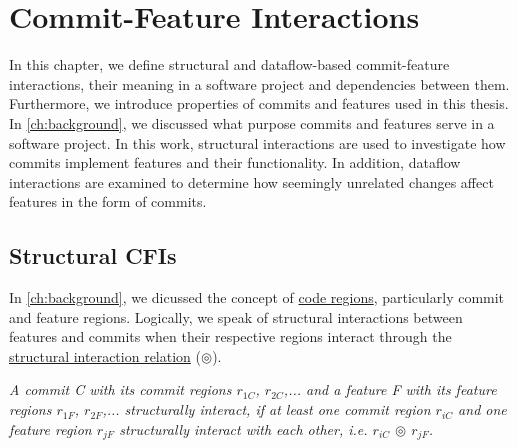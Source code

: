 \chapter{Commit-Feature Interactions}\label{ch:example_chapter}

In this chapter, we define structural and dataflow-based commit-feature interactions, their meaning in a software project and dependencies between them.
Furthermore, we introduce properties of commits and features used in this thesis. 
In \autoref{ch:background}, we discussed what purpose commits and features serve in a software project.
In this work, structural interactions are used to investigate how commits implement features and their functionality.
In addition, dataflow interactions are examined to determine how seemingly unrelated changes affect features in the form of commits. 

\section{Structural CFIs}\label{sec:structural_cfis}

In \autoref{ch:background}, we dicussed the concept of \hyperref[ch:code_regions]{code regions}, particularly commit and feature regions. 
Logically, we speak of structural interactions between features and commits when their respective regions interact through the \hyperref[def:structural_relation]{structural interaction relation} ($\circledcirc$).

\begin{definition}\label{def:structural_cfi}
\emph{A commit C with its commit regions $r_{1C}$, $r_{2C}$,... and a feature F with its feature regions $r_{1F}$, $r_{2F}$,... structurally interact, if at least one commit region $r_{iC}$ and one feature region $r_{jF}$ structurally interact with each other, i.e. $r_{iC}$ $\circledcirc$ $r_{jF}$.}
\end{definition}

